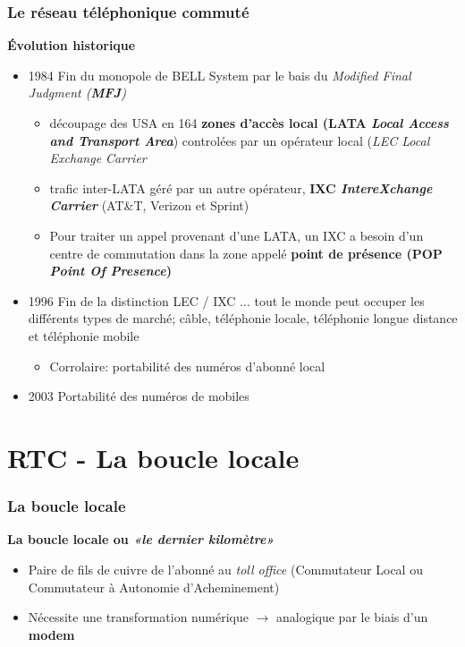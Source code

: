 \begin{frame}[fragile]
  \frametitle{Le réseau téléphonique commuté}
{\large\bf Évolution historique}
\begin{itemize}
	\item 1984 Fin du monopole de BELL System par le bais du 
	\textit{Modified Final Judgment (\textbf{MFJ})}
	\begin{itemize}
		\item découpage des USA en 164 \textbf{zones d'accès local 
		(LATA \textit{Local Access and Transport Area}}) controlées par un
		opérateur local (\textit{LEC Local Exchange Carrier}
		\item trafic inter-LATA géré par un autre opérateur,
		\textbf{IXC \textit{IntereXchange Carrier}} (AT\&T, Verizon et Sprint)
		\item Pour traiter un appel provenant d'une LATA, un IXC a besoin d'un
		centre de commutation dans la zone appelé \textbf{point de présence (POP
		\textit{Point Of Presence})}
	\end{itemize}
	\item 1996 Fin de la distinction LEC / IXC ... tout le monde peut occuper
	les différents types de marché; câble, téléphonie locale, téléphonie longue
	distance et téléphonie mobile
	\begin{itemize}
	 	\item Corrolaire: portabilité des numéros d'abonné local
	\end{itemize}
	\item 2003 Portabilité des numéros de mobiles
\end{itemize}
\end{frame}

\section{RTC - La boucle locale}

\begin{frame}[fragile]
  \frametitle{La boucle locale}
{\large\bf La \textbf{boucle locale} ou \textit{«le dernier kilomètre»}}
\begin{itemize}
	\item Paire de fils de cuivre de l'abonné au \textit{toll office}
	(Commutateur Local ou Commutateur à Autonomie d'Acheminement) 
	\item Nécessite une transformation numérique $\rightarrow$ analogique par le
	biais d'un \textbf{modem}
\end{itemize}
\end{frame}

